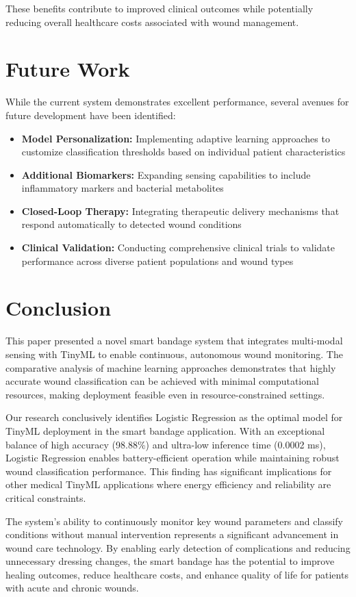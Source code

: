 \documentclass[conference]{IEEEtran}
\begin{document}
These benefits contribute to improved clinical outcomes while potentially reducing overall healthcare costs associated with wound management.

\section{Future Work}
While the current system demonstrates excellent performance, several avenues for future development have been identified:

\begin{itemize}
    \item \textbf{Model Personalization:} Implementing adaptive learning approaches to customize classification thresholds based on individual patient characteristics
    \item \textbf{Additional Biomarkers:} Expanding sensing capabilities to include inflammatory markers and bacterial metabolites
    \item \textbf{Closed-Loop Therapy:} Integrating therapeutic delivery mechanisms that respond automatically to detected wound conditions
    \item \textbf{Clinical Validation:} Conducting comprehensive clinical trials to validate performance across diverse patient populations and wound types
\end{itemize}

\section{Conclusion}
This paper presented a novel smart bandage system that integrates multi-modal sensing with TinyML to enable continuous, autonomous wound monitoring. The comparative analysis of machine learning approaches demonstrates that highly accurate wound classification can be achieved with minimal computational resources, making deployment feasible even in resource-constrained settings.

Our research conclusively identifies Logistic Regression as the optimal model for TinyML deployment in the smart bandage application. With an exceptional balance of high accuracy (98.88\%) and ultra-low inference time (0.0002 ms), Logistic Regression enables battery-efficient operation while maintaining robust wound classification performance. This finding has significant implications for other medical TinyML applications where energy efficiency and reliability are critical constraints.

The system's ability to continuously monitor key wound parameters and classify conditions without manual intervention represents a significant advancement in wound care technology. By enabling early detection of complications and reducing unnecessary dressing changes, the smart bandage has the potential to improve healing outcomes, reduce healthcare costs, and enhance quality of life for patients with acute and chronic wounds.
\end{document}

